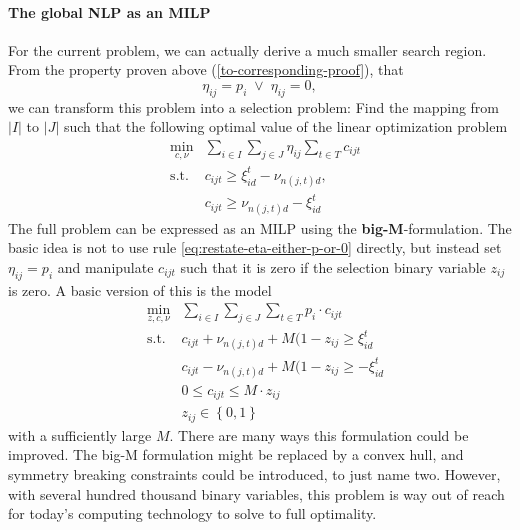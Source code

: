\paragraph{The global NLP as an MILP} For the current problem, we can actually derive a much smaller search region. From the property proven above (\ref{to-corresponding-proof}), that
\begin{equation}
  \label{eq:restate-eta-either-p-or-0}
  \eta_{ij} = p_i \;\vee \; \eta_{ij}=0,
\end{equation}
we can transform this problem into a selection problem: Find the mapping from $|I|$ to $|J|$ such that the following optimal value of the linear optimization problem
\begin{eqnarray}
  \label{eq:global-NLP-as-MILP-inner-LP}
  &\min\limits_{c,\nu}&\sum_{i\in I}\sum_{j\in J}\eta_{ij}\sum_{t\in T}c_{ijt}\\
  &\mathrm{s.t.}&c_{ijt} \geq \xi_{id}^t - \nu_{n(j,t)d},\\
  &&c_{ijt} \geq \nu_{n(j,t)d} - \xi_{id}^t
\end{eqnarray}
The full problem can be expressed as an MILP using the \textbf{big-M}-formulation. The basic idea is not to use rule \ref{eq:restate-eta-either-p-or-0} directly, but instead set $\eta_{ij}=p_i$ and manipulate $c_{ijt}$ such that it is zero if the selection binary variable $z_{ij}$ is zero. A basic version of this is the model
\begin{eqnarray}
  \label{eq:NLP-as-MILP-full}
  &\min\limits_{z,c,\nu}&\sum_{i\in I}\sum_{j\in J}\sum_{t\in T}p_i\cdot c_{ijt}\\
  &\mathrm{s.t.}&c_{ijt}+ \nu_{n(j,t)d}+M(1-z_{ij} \geq \xi_{id}^t\\
  &&c_{ijt} -\nu_{n(j,t)d} +M(1-z_{ij}\geq - \xi_{id}^t\\
  &&0\leq c_{ijt} \leq M\cdot z_{ij}\\
  \label{eq:NLP-as-MILP-full-bounds}
  &&z_{ij}\in \left\{0,1\right\}
\end{eqnarray}
with a sufficiently large $M$. There are many ways this formulation could be improved. The big-M formulation might be replaced by a convex hull, and symmetry breaking constraints could be introduced, to just name two. However, with several hundred thousand binary variables,  this problem is way out of reach for today's computing technology to solve to full optimality.

